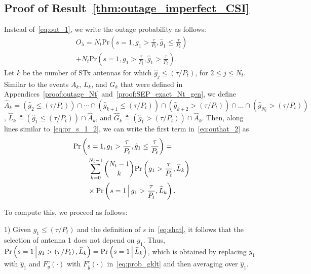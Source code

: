 \documentclass[journal]{IEEEtran}
\newcommand{\brac}[1]{\left({#1}\right)}
\newcommand{\define}{\triangleq}
\newcommand{\prob}[1]{\text{Pr}\brac{#1}}
\newcommand{\Given}{\Big\arrowvert}
\newcommand{\nck}[2]{\binom{#1}{#2}}
\newcommand{\setA}{A}
\newcommand{\setAk}{\setA_{k}}
\newcommand{\setAkhat}{\widehat{\setA}_k}
\newcommand{\setG}{G}
\newcommand{\setL}{L}
\newcommand{\setGk}{\setG_k}
\newcommand{\setLk}{\setL_k}
\newcommand{\setGkhat}{\widehat{\setG}_k}
\newcommand{\setLkhat}{\widehat{\setL}_k}
\newcommand{\lam}{\lambda}
\newcommand{\Nt}{{N_t}}
\newcommand{\Pt}{{P_t}}
\newcommand{\puch}{g}
\newcommand{\gk}[1]{{\puch_{#1}}}
\newcommand{\itau}{\tau}
\newcommand{\out}{O}
\newcommand{\taubypt}{\frac{\itau}{\Pt}}
\newcommand{\taubyptinl}{{\itau}/{\Pt}}
\newcommand{\gkgrtaubypt}[1]{{\gk{#1}}>\taubypt}
\newcommand{\gkhatgrtaubypt}[1]{{\gkhat{#1}}>\taubypt}
\newcommand{\gkhatlttaubypt}[1]{{\gkhat{#1}}\leq\taubypt}
\newcommand{\gkgrtaubyptinl}[1]{{\gk{#1}}>\left( \taubyptinl \right) }
\newcommand{\gkhatlttaubyptinl}[1]{{\gkhat{#1}}\leq\left( \taubyptinl\right) }
\newcommand{\gkhatgrtaubyptinl}[1]{{\gkhat{#1}}>\left( \taubyptinl\right) }
\newcommand{\yk}[1]{y_{#1}}
\newcommand{\outlam}{\out_{\lam}}
\newcommand{\ghat}{\hat{\puch}}
\newcommand{\yhat}{\hat{y}}
\newcommand{\gkhat}[1]{\ghat_{#1}}
\newcommand{\ykhat}[1]{\hat{y}_{#1}}
\newcommand{\ccdfyrv}[1]{ F^{c}_{y}\left(#1 \right) }
\newcommand{\ccdfyhatrv}[1]{F^{c}_{\yhat}\left(#1 \right) }
\begin{document}
\subsection{Proof of Result~\ref{thm:outage_imperfect_CSI}}
\label{proof:outage_imperfect_CSI}
Instead of~\eqref{eq:out_1}, we write the outage probability as follows: 
\begin{multline}
\outlam= \Nt\text{Pr}\brac{s=1,\gkgrtaubypt{1},\gkhatlttaubypt{1}}  \\+ \Nt\text{Pr}\brac{s=1,\gkgrtaubypt{1},\gkhatgrtaubypt{1}}.
\label{eq:outhat_2}
\end{multline}
Let $k$ be the number of STx antennas for which $\gkhatlttaubyptinl{j}$, for $2\leq j \leq\Nt$. Similar to the events $\setAk$, $\setLk$,  and  $\setGk$ that were defined in Appendices~\ref{proof:outage_Nt} and~\ref{proof:SEP_exact_Nt_gen}, we define $\setAkhat=\left(  \gkhatlttaubyptinl{2}\right)\cap\cdots\cap\left(\gkhatlttaubyptinl{k+1}\right)\cap\left(\gkhatgrtaubyptinl{k+2}\right)\cap\dots\cap\left(\gkhatgrtaubyptinl{\Nt}\right)$, $\setLkhat\define\left(\gkhatlttaubyptinl{1}\right)\cap\setAkhat$, and $\setGkhat\define\left(\gkhatgrtaubyptinl{1}\right)\cap\setAkhat$. Then, along lines similar to~\eqref{eq:pr_s_1_2}, we can write the first term in~\eqref{eq:outhat_2}  as
%
\begin{align}
&\text{Pr}\brac{s=1,\gkgrtaubypt{1},\gkhatlttaubypt{1}}  =\nonumber\\
&\quad\quad\sum_{k=0}^{\Nt-1}\nck{\Nt-1}{k}
\prob{\gkgrtaubypt{1},\setLkhat}\nonumber\\
&\quad\quad\times\text{Pr}\brac{s = 1 \Given \gkgrtaubypt{1},\setLkhat}. 
\label{eq:pr_s_1_2_imp}
\end{align}

To compute this, we proceed as follows:

1) Given $\gkhatlttaubyptinl{1}$ and the definition of $s$ in~\eqref{eq:shat}, it follows that the selection of antenna 1 does not depend on $\gk{1}$. Thus, $\prob{s = 1 \Given \gkgrtaubyptinl{1},\setLkhat}=\prob{s = 1 \Given \setLkhat}$, which is obtained by replacing $\yk{1}$ with $\ykhat{1}$ and $\ccdfyrv{\cdot}$ with $\ccdfyhatrv{\cdot}$ in~\eqref{eq:prob_gklt} and then averaging over $\ykhat{1}$. 
\end{document}
